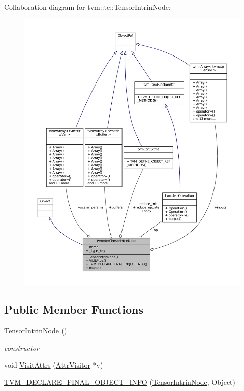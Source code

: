 Collaboration diagram for tvm\+:\+:te\+:\+:Tensor\+Intrin\+Node\+:
\nopagebreak
\begin{figure}[H]
\begin{center}
\leavevmode
\includegraphics[width=350pt]{classtvm_1_1te_1_1TensorIntrinNode__coll__graph}
\end{center}
\end{figure}
\subsection*{Public Member Functions}
\begin{DoxyCompactItemize}
\item 
\hyperlink{classtvm_1_1te_1_1TensorIntrinNode_ad59e7f2b881fc798a8c64fd3959f929c}{Tensor\+Intrin\+Node} ()
\begin{DoxyCompactList}\small\item\em constructor \end{DoxyCompactList}\item 
void \hyperlink{classtvm_1_1te_1_1TensorIntrinNode_a2e2af80bface65c26355fa8864d3cffe}{Visit\+Attrs} (\hyperlink{classtvm_1_1AttrVisitor}{Attr\+Visitor} $\ast$v)
\item 
\hyperlink{classtvm_1_1te_1_1TensorIntrinNode_ab3283714723586b6a91a0484e517dc0c}{T\+V\+M\+\_\+\+D\+E\+C\+L\+A\+R\+E\+\_\+\+F\+I\+N\+A\+L\+\_\+\+O\+B\+J\+E\+C\+T\+\_\+\+I\+N\+FO} (\hyperlink{classtvm_1_1te_1_1TensorIntrinNode}{Tensor\+Intrin\+Node}, Object)
\end{DoxyCompactItemize}
